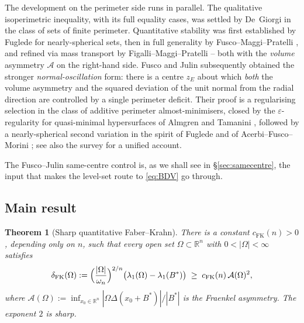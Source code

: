 \documentclass[11pt]{amsart}
\newtheorem{theorem}{Theorem}[section]
\theoremstyle{definition}
\newcommand{\R}{\mathbb R}
\newcommand{\Om}{\Omega}
\newcommand{\Fr}{\mathcal A}
\newcommand{\eps}{\varepsilon}
\newcommand{\Bstar}{B^*}
\newcommand{\deltaFK}{\delta_{\mathrm{FK}}}
\begin{document}
\medskip
The development on the perimeter side runs in parallel.  The qualitative
isoperimetric inequality, with its full equality cases, was settled by
De~Giorgi \cite{DeGiorgi1958} in the class of sets of finite perimeter.
Quantitative stability was first established by Fuglede \cite{Fuglede1989}
for nearly-spherical sets, then in full generality by Fusco--Maggi--Pratelli
\cite{FMP}, and refined via mass transport by Figalli--Maggi--Pratelli
\cite{FMP2010} -- both with the \emph{volume} asymmetry \(\Fr\) on the
right-hand side.  Fusco and Julin \cite{FJ2014} subsequently obtained the
stronger \emph{normal-oscillation} form: there is a centre \(z_E\) about
which \emph{both} the volume asymmetry and the squared deviation of the
unit normal from the radial direction are controlled by a single perimeter
deficit.  Their proof is a regularising selection in the class of additive
perimeter almost-minimisers, closed by the \(\eps\)-regularity for
quasi-minimal hypersurfaces of Almgren \cite{Almgren1976} and Tamanini
\cite{Tamanini1984}, followed by a nearly-spherical second variation in
the spirit of Fuglede and of Acerbi--Fusco--Morini
\cite{AcerbiFuscoMorini2013}; see also the survey \cite{Krummel2014} for a
unified account.

The Fusco--Julin same-centre control is, as we shall see in
\S\ref{sec:samecentre}, the input that makes the level-set route to
\eqref{eq:BDV} go through.

\subsection{Main result}\label{sec:intro-main}

\begin{theorem}[Sharp quantitative Faber--Krahn]\label{thm:FK-main}
There is a constant \(c_{\mathrm{FK}}(n)>0\), depending only on \(n\), such that
every open set \(\Om\subset\R^n\) with \(0<|\Om|<\infty\) satisfies
\begin{equation}\label{eq:FK-main}
   \deltaFK(\Om):=
   \Bigl(\frac{|\Om|}{\omega_n}\Bigr)^{2/n}
   \bigl(\lambda_1(\Om)-\lambda_1(\Bstar)\bigr)
   \;\ge\; c_{\mathrm{FK}}(n)\,\Fr(\Om)^2,
\end{equation}
where \(\Fr(\Om):=\inf_{x_0\in\R^n}|\Om\Delta(x_0+\Bstar)|/|\Bstar|\) is the
Fraenkel asymmetry.  The exponent \(2\) is sharp.
\end{theorem}
\end{document}

